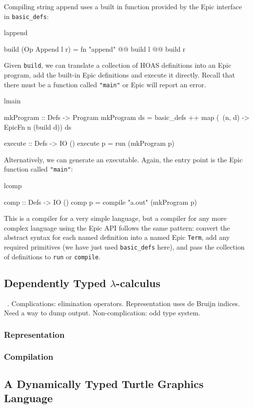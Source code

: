 Compiling string append uses a built in function provided by the Epic
interface in \texttt{basic\_defs}:

\begin{SaveVerbatim}{lappend}

build (Op Append l r) 
       = fn "append" @@ build l @@ build r

\end{SaveVerbatim}

\noindent
Given \texttt{build}, we can translate a collection of HOAS
definitions into an Epic program, add the built-in Epic definitions
and execute it directly. Recall that there must be a function called
\texttt{"main"} or Epic will report an error.

\begin{SaveVerbatim}{lmain}

mkProgram :: Defs -> Program
mkProgram ds = basic_defs ++ 
               map (\ (n, d) -> EpicFn n (build d)) ds

execute :: Defs -> IO ()
execute p = run (mkProgram p)

\end{SaveVerbatim}

\noindent
Alternatively, we can generate an executable. Again, the entry point
is the Epic function called \texttt{"main"}:

\begin{SaveVerbatim}{lcomp}

comp :: Defs -> IO ()
comp p = compile "a.out" (mkProgram p)

\end{SaveVerbatim}

\noindent
This is a compiler for a very simple language, but a compiler for any
more complex language using the Epic API follows the same pattern:
convert the abstract syntax for each named definition into a named Epic
\texttt{Term}, add any required primitives (we have just used
\texttt{basic\_defs} here), and pass the collection of definitions to
\texttt{run} or \texttt{compile}.

\subsection{Dependently Typed $\lambda$-calculus}

\LamPi{}~\cite{simply-easy}. Complications: elimination
operators. Representation uses de Bruijn indices. Need a way to dump
output. Non-complication: odd type system.

\subsubsection{Representation}

\subsubsection{Compilation}

\subsection{A Dynamically Typed Turtle Graphics Language}



